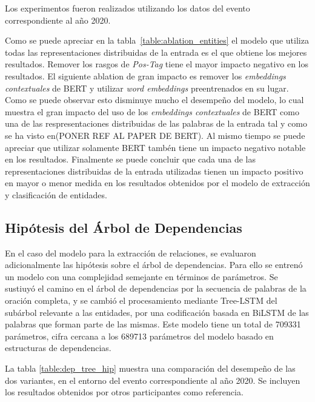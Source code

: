Los experimentos fueron realizados utilizando los datos del evento correspondiente al año 2020.

Como se puede apreciar en la tabla~\ref{table:ablation_entities} el modelo que utiliza todas las representaciones distribuidas de la entrada es el que obtiene los mejores resultados. Remover los rasgos de \emph{Pos-Tag} tiene el mayor impacto negativo en los resultados. El siguiente ablation de gran impacto es remover los \emph{embeddings contextuales} de BERT y utilizar \emph{word embeddings} preentrenados en su lugar. Como se puede observar esto disminuye mucho el desempe\~no del modelo, lo cual muestra el gran impacto del uso de los \emph{embeddings contextuales} de BERT como una de las respresentaciones distribuidas de las palabras de la entrada tal y como se ha visto en(PONER REF AL PAPER DE BERT). Al mismo tiempo se puede apreciar que utilizar solamente BERT tamb\'en tiene un impacto negativo notable en los resultados. Finalmente se puede concluir que cada una de las representaciones distribuidas de la entrada utilizadas tienen un impacto positivo en mayor o menor medida en los resultados obtenidos por el modelo de extracci\'on y clasificaci\'on de entidades.

\subsection{Hipótesis del Árbol de Dependencias}

En el caso del modelo para la extracción de relaciones, se evaluaron adicionalmente las hipótesis sobre el árbol de dependencias.
Para ello se entrenó un modelo con una complejidad semejante en términos de parámetros.
Se sustiuyó el camino en el árbol de dependencias por la secuencia de palabras de la oración completa, y se cambió el procesamiento mediante Tree-LSTM del subárbol relevante a las entidades, por una codificación basada en BiLSTM de las palabras que forman parte de las mismas.
Este modelo tiene un total de 709331 parámetros, cifra cercana a los 689713 parámetros del modelo basado en estructuras de dependencias.

La tabla \ref{table:dep_tree_hip} muestra una comparación del desempeño de las dos variantes, en el entorno del evento correspondiente al año 2020. Se incluyen los resultados obtenidos por otros participantes como referencia.

